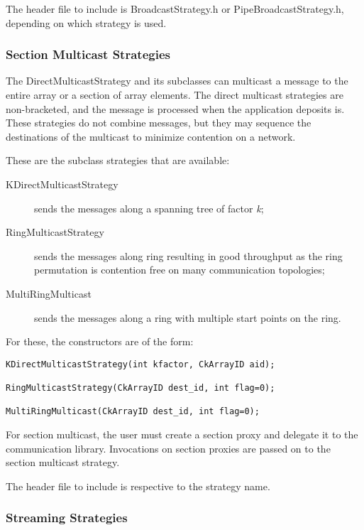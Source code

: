 {The header file to include is {\textrm{BroadcastStrategy.h}} or
{\textrm{PipeBroadcastStrategy.h}}, depending on which strategy is used.

\subsubsection{Section Multicast Strategies}

The DirectMulticastStrategy and its subclasses can multicast a message to the entire
array or a section of array elements. The direct multicast strategies
are non-bracketed, and the message is processed when the application
deposits is. These strategies do not combine messages, but they may
sequence the destinations of the multicast to minimize contention on a
network.

These are the subclass strategies that are available:

\begin{description}
\item[KDirectMulticastStrategy] sends the messages along a spanning tree of factor {\em k};
\item[RingMulticastStrategy] sends the messages along ring resulting in good throughput as the ring permutation is contention free on many communication topologies;
\item[MultiRingMulticast] sends the messages along a ring with multiple start points on the ring.
\end{description}

For these, the constructors are of the form:

\begin{verbatim}
KDirectMulticastStrategy(int kfactor, CkArrayID aid);

RingMulticastStrategy(CkArrayID dest_id, int flag=0);

MultiRingMulticast(CkArrayID dest_id, int flag=0);
\end{verbatim}

For section multicast, the user must create a section proxy and delegate it to
the communication library. Invocations on section proxies are passed on to the
section multicast strategy.

The header file to include is respective to the strategy name.

\subsubsection{Streaming Strategies}

}

